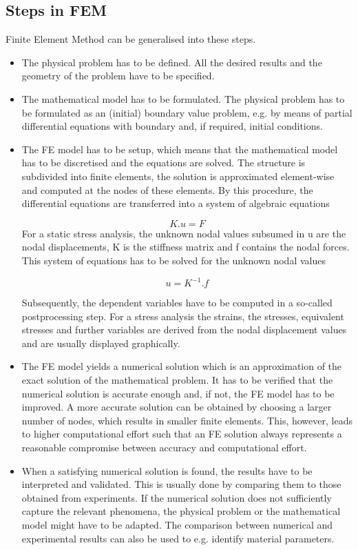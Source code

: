 \subsection{Steps in FEM}
Finite Element Method can be generalised into these steps.
\begin{itemize}
 
 \item The physical problem has to be defined. All the desired results and the geometry of the problem have to be specified.

\item The mathematical model has to be formulated.
The physical problem has to be formulated as an (initial) boundary value problem, e.g. by means of partial differential equations with boundary and, if required, initial conditions.

\item The FE model has to be setup, which means that the mathematical model has to be discretised and the equations are solved. The structure is subdivided into finite elements, the solution is approximated element-wise and computed at the nodes of these elements. By this procedure, the differential equations are transferred into a system of algebraic equations

\begin{equation}
K.u = F
\end{equation}
For a static stress analysis, the unknown nodal values subsumed in u are the nodal displacements, K is the stiffness matrix and f contains the nodal forces. This system of equations has to be solved for the unknown nodal values

\begin{equation}
u = K^{-1}.f
\end{equation}

Subsequently, the dependent variables have to be computed in a so-called postprocessing step. For a stress analysis the strains, the stresses, equivalent stresses and further variables are derived from the nodal displacement values and are usually displayed graphically.

\item The FE model yields a numerical solution which is an approximation of the exact solution of the mathematical problem. It has to be verified that the numerical solution is accurate enough and, if not, the FE model has to be improved. A more accurate solution can be obtained by choosing a larger number of nodes, which results in smaller finite elements. This, however, leads to higher computational effort such that an FE solution always represents a reasonable compromise between accuracy and computational effort.


\item When a satisfying numerical solution is found, the results have to be interpreted and validated. This is usually done by comparing them to those obtained from experiments. If the numerical solution does not sufficiently capture the relevant phenomena, the physical problem or the mathematical model might have to be adapted. The comparison between numerical and experimental results can also be used to e.g. identify material parameters.
\end{itemize}



